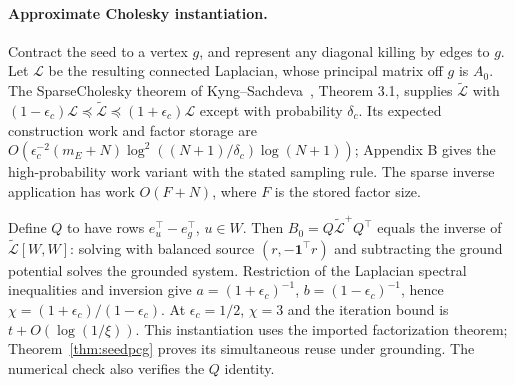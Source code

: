 \documentclass[11pt]{article}
\newcommand{\ind}{\mathbf 1}
\begin{document}
\paragraph{Approximate Cholesky instantiation.}
Contract the seed to a vertex $g$, and represent any diagonal
killing by edges to $g$. Let $\mathcal L$ be the resulting connected
Laplacian, whose principal matrix off $g$ is $A_0$. The
SparseCholesky theorem of Kyng--Sachdeva~\cite{kyng2016},
Theorem 3.1, supplies $\widetilde{\mathcal L}$ with
$(1-\epsilon_c)\mathcal L\preceq\widetilde{\mathcal L}
\preceq(1+\epsilon_c)\mathcal L$ except with probability $\delta_c$.
Its expected construction work and factor storage are
$O(\epsilon_c^{-2}(m_E+N)\log^2((N+1)/\delta_c)\log(N+1))$;
Appendix B gives the high-probability work variant with the stated
sampling rule. The sparse inverse application has work $O(F+N)$,
where $F$ is the stored factor size.

Define $Q$ to have rows $e_u^\top-e_g^\top$, $u\in W$.
Then $B_0=Q\widetilde{\mathcal L}^{+}Q^\top$ equals the inverse
of $\widetilde{\mathcal L}[W,W]$: solving with balanced source
$(r,-\ind^\top r)$ and subtracting the ground potential solves
the grounded system. Restriction of the Laplacian spectral
inequalities and inversion give
$a=(1+\epsilon_c)^{-1}$, $b=(1-\epsilon_c)^{-1}$, hence
$\chi=(1+\epsilon_c)/(1-\epsilon_c)$. At $\epsilon_c=1/2$,
$\chi=3$ and the iteration bound is $t+O(\log(1/\xi))$.
This instantiation uses the imported factorization theorem;
Theorem~\ref{thm:seedpcg} proves its simultaneous reuse under
grounding. The numerical check also verifies the $Q$ identity.
\end{document}
